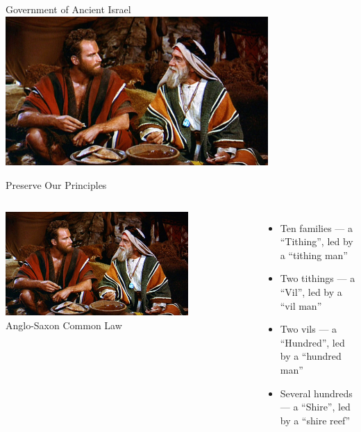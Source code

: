 \begin{frame}{Government of Ancient Israel}
    \centering
    \includegraphics[width=0.75\textwidth]{img/moses.jpg} \\
\end{frame}

\begin{frame}{Preserve Our Principles}
    \begin{columns}[onlytextwidth]
            \centering
            \includegraphics[width=0.75\textwidth]{img/moses.jpg} \\
            Anglo-Saxon Common Law \color{red}\\

            \begin{itemize}
                \item Ten families --- a ``Tithing'', led by a ``tithing man''
                \item Two tithings --- a ``Vil'', led by a ``vil man''
                \item Two vils --- a ``Hundred'', led by a ``hundred man''
                \item Several hundreds --- a ``Shire'', led by a ``shire reef''
            \end{itemize}
    \end{columns}
\end{frame}

